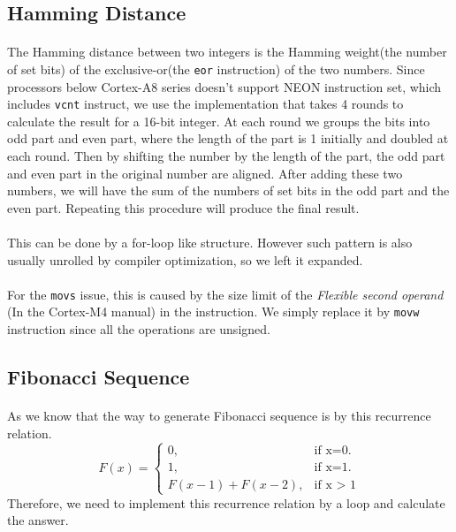 \subsection{Hamming Distance}
\paragraph{}
The Hamming distance between two integers is the Hamming weight(the number of set bits)
of the exclusive-or(the \texttt{eor} instruction) of the two numbers.
Since processors below Cortex-A8 series doesn't support NEON instruction set, which includes \texttt{vcnt} instruct, we use the implementation
that takes 4 rounds to calculate the result for a 16-bit integer. At each round we groups the bits into odd part and even part,
where the length of the part is 1 initially and doubled at each round.
Then by shifting the number by the length of the part, the odd part and even part in the original number are aligned. 
After adding these two numbers, we will have the sum of the numbers of set bits in the odd part and the even part.
Repeating this procedure will produce the final result.
\paragraph{}
This can be done by a for-loop like structure. However such pattern is also usually unrolled by compiler optimization,
so we left it expanded.
\paragraph{}
For the \texttt{movs} issue, this is caused by the size limit of the \textit{Flexible second operand}
(In the Cortex-M4 manual) in the instruction.
We simply replace it by \texttt{movw} instruction since all the operations are unsigned.


\subsection{Fibonacci Sequence}
\paragraph{}
As we know that the way to generate Fibonacci sequence is by this recurrence relation.
\begin{equation}
  F(x)=\begin{cases}
    0, & \text{if x=0}.\\
    1, & \text{if x=1}.\\
    F(x - 1) + F(x - 2), & \text{if x > 1}
  \end{cases}
\end{equation}
Therefore, we need to implement this recurrence relation by a loop and calculate the answer.
